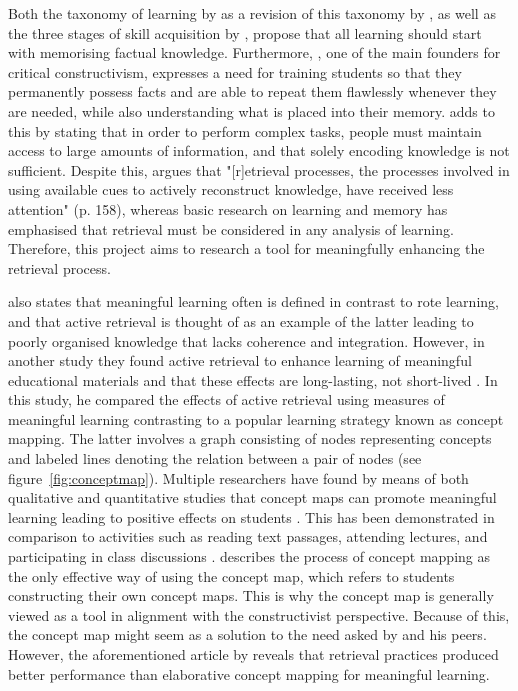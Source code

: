 \documentclass[11pt,twoside]{report} %
\begin{document}


Both the taxonomy of learning by  as a revision of this taxonomy by , as well as the three stages of skill acquisition by , propose that all learning should start with memorising factual knowledge. Furthermore, , one of the main founders for critical constructivism, expresses a need for training students so that they permanently possess facts and are able to repeat them flawlessly whenever they are needed, while also understanding what is placed into their memory.  adds to this by stating that in order to perform complex tasks, people must maintain access to large amounts of information, and that solely encoding knowledge is not sufficient. Despite this,  argues that "[r]etrieval processes, the processes involved in using available cues to actively reconstruct knowledge, have received less attention" (p. 158), whereas basic research on learning and memory has emphasised that retrieval must be considered in any analysis of learning. Therefore, this project aims to research a tool for meaningfully enhancing the retrieval process. 

 also states that meaningful learning often is defined in contrast to rote learning, and that active retrieval is thought of as an example of the latter leading to poorly organised knowledge that lacks coherence and integration. However, in another study they found active retrieval to enhance learning of meaningful educational materials and that these effects are long-lasting, not short-lived \cite{karpicke2}. In this study, he compared the effects of active retrieval using measures of meaningful learning contrasting to a popular learning strategy known as concept mapping. The latter involves a graph consisting of nodes representing concepts and labeled lines denoting the relation between a pair of nodes \cite{ruiz1} (see figure~\ref{fig:conceptmap}). Multiple researchers have found by means of both qualitative and quantitative studies that concept maps can promote meaningful learning leading to positive effects on students \cite{hwang2, subramaniam, canas}. This has been demonstrated in comparison to activities such as reading text passages, attending lectures, and participating in class discussions \cite{singh, nesbit2}.  describes the process of concept mapping as the only effective way of using the concept map, which refers to students constructing their own concept maps. This is why the concept map is generally viewed as a tool in alignment with the constructivist perspective. Because of this, the concept map might seem as a solution to the need asked by  and his peers. However, the aforementioned article by  reveals that retrieval practices produced better performance than elaborative concept mapping for meaningful learning.
\end{document}

